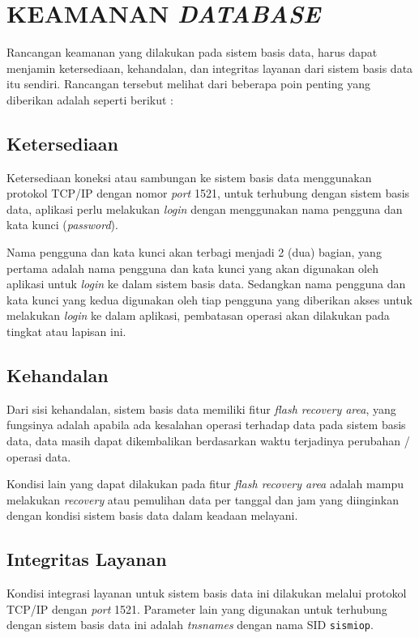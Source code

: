 \chapter{KEAMANAN \textit{DATABASE}}

Rancangan keamanan yang dilakukan pada sistem basis data, harus dapat menjamin ketersediaan, kehandalan, dan integritas layanan dari sistem basis data itu sendiri. Rancangan tersebut melihat dari beberapa poin penting yang diberikan adalah seperti berikut :

\section{Ketersediaan}

Ketersediaan koneksi atau sambungan ke sistem basis data menggunakan protokol TCP/IP dengan nomor \textit{port} 1521, untuk terhubung dengan sistem basis data, aplikasi perlu melakukan \textit{login} dengan menggunakan nama pengguna dan kata kunci (\textit{password}).

Nama pengguna dan kata kunci akan terbagi menjadi 2 (dua) bagian, yang pertama adalah nama pengguna dan kata kunci yang akan digunakan oleh aplikasi untuk \textit{login} ke dalam sistem basis data. Sedangkan nama pengguna dan kata kunci yang kedua digunakan oleh tiap pengguna yang diberikan akses untuk melakukan \textit{login} ke dalam aplikasi, pembatasan operasi akan dilakukan pada tingkat atau lapisan ini.

\section{Kehandalan}

Dari sisi kehandalan, sistem basis data memiliki fitur \textit{flash recovery area}, yang fungsinya adalah apabila ada kesalahan operasi terhadap data pada sistem basis data, data masih dapat dikembalikan berdasarkan waktu terjadinya perubahan / operasi data.

Kondisi lain yang dapat dilakukan pada fitur \textit{flash recovery area} adalah mampu melakukan \textit{recovery} atau pemulihan data per tanggal dan jam yang diinginkan dengan kondisi sistem basis data dalam keadaan melayani.

\section{Integritas Layanan}

Kondisi integrasi layanan untuk sistem basis data ini dilakukan melalui protokol TCP/IP dengan \textit{port} 1521. Parameter lain yang digunakan untuk terhubung dengan sistem basis data ini adalah \textit{tnsnames} dengan nama SID \texttt{sismiop}.